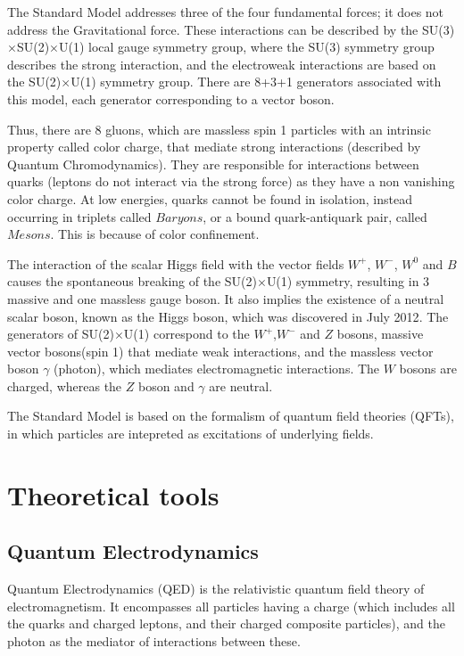 \documentclass[11pt,a4paper]{report}
\begin{document}
The Standard Model addresses three of the four fundamental forces; it does not address the Gravitational force. These interactions can be described by the SU(3)$\times$SU(2)$\times$U(1) local gauge symmetry group, where the SU(3) symmetry group describes the strong interaction, and the electroweak interactions are based on the SU(2)$\times$U(1) symmetry group. There are 8+3+1 generators associated with this model, each generator corresponding to a vector boson. 

Thus, there are 8 gluons, which are massless spin 1 particles with an intrinsic property called color charge, that mediate strong interactions (described by Quantum Chromodynamics). They are responsible for interactions between quarks (leptons do not interact via the strong force) as they have a non vanishing color charge. At low energies, quarks cannot be found in isolation, instead occurring in triplets called $Baryons$, or a bound quark-antiquark pair, called $Mesons$. This is because of color confinement. 

The interaction of the scalar Higgs field with the vector fields $W^+$, $W^-$, $W^0$ and $B$ causes the spontaneous breaking of the SU(2)$\times$U(1) symmetry, resulting in 3 massive and one massless gauge boson. It also implies the existence of a neutral scalar boson, known as the Higgs boson, which was discovered in July 2012\cite{Higgs}. The generators of SU(2)$\times$U(1) correspond to the $W^+$,$W^-$ and $Z$ bosons, massive vector bosons(spin 1) that mediate weak interactions, and the massless vector boson $\gamma$ (photon), which mediates electromagnetic interactions. The $W$ bosons are charged, whereas the $Z$ boson and $\gamma$ are neutral.

The Standard Model is based on the formalism of quantum field theories (QFTs), in which particles are intepreted as excitations of underlying fields.

\section{Theoretical tools}
\subsection{Quantum Electrodynamics}
Quantum Electrodynamics (QED) is the relativistic quantum field theory of electromagnetism. It encompasses all particles having a charge (which includes all the quarks and charged leptons, and their charged composite particles), and the photon as the mediator of interactions between these.
\end{document}
